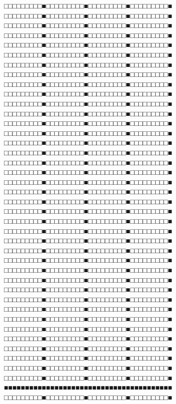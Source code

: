 \noindent
□□□□□□□□□■□□□□□□□□□■□□□□□□□□□■□□□□□□□□□■
□□□□□□□□□■□□□□□□□□□■□□□□□□□□□■□□□□□□□□□■
□□□□□□□□□■□□□□□□□□□■□□□□□□□□□■□□□□□□□□□■
□□□□□□□□□■□□□□□□□□□■□□□□□□□□□■□□□□□□□□□■
□□□□□□□□□■□□□□□□□□□■□□□□□□□□□■□□□□□□□□□■
□□□□□□□□□■□□□□□□□□□■□□□□□□□□□■□□□□□□□□□■
□□□□□□□□□■□□□□□□□□□■□□□□□□□□□■□□□□□□□□□■
□□□□□□□□□■□□□□□□□□□■□□□□□□□□□■□□□□□□□□□■
□□□□□□□□□■□□□□□□□□□■□□□□□□□□□■□□□□□□□□□■
□□□□□□□□□■□□□□□□□□□■□□□□□□□□□■□□□□□□□□□■
□□□□□□□□□■□□□□□□□□□■□□□□□□□□□■□□□□□□□□□■
□□□□□□□□□■□□□□□□□□□■□□□□□□□□□■□□□□□□□□□■
□□□□□□□□□■□□□□□□□□□■□□□□□□□□□■□□□□□□□□□■
□□□□□□□□□■□□□□□□□□□■□□□□□□□□□■□□□□□□□□□■
□□□□□□□□□■□□□□□□□□□■□□□□□□□□□■□□□□□□□□□■
□□□□□□□□□■□□□□□□□□□■□□□□□□□□□■□□□□□□□□□■
□□□□□□□□□■□□□□□□□□□■□□□□□□□□□■□□□□□□□□□■
□□□□□□□□□■□□□□□□□□□■□□□□□□□□□■□□□□□□□□□■
□□□□□□□□□■□□□□□□□□□■□□□□□□□□□■□□□□□□□□□■
□□□□□□□□□■□□□□□□□□□■□□□□□□□□□■□□□□□□□□□■
□□□□□□□□□■□□□□□□□□□■□□□□□□□□□■□□□□□□□□□■
□□□□□□□□□■□□□□□□□□□■□□□□□□□□□■□□□□□□□□□■
□□□□□□□□□■□□□□□□□□□■□□□□□□□□□■□□□□□□□□□■
□□□□□□□□□■□□□□□□□□□■□□□□□□□□□■□□□□□□□□□■
□□□□□□□□□■□□□□□□□□□■□□□□□□□□□■□□□□□□□□□■
□□□□□□□□□■□□□□□□□□□■□□□□□□□□□■□□□□□□□□□■
□□□□□□□□□■□□□□□□□□□■□□□□□□□□□■□□□□□□□□□■
□□□□□□□□□■□□□□□□□□□■□□□□□□□□□■□□□□□□□□□■
□□□□□□□□□■□□□□□□□□□■□□□□□□□□□■□□□□□□□□□■
□□□□□□□□□■□□□□□□□□□■□□□□□□□□□■□□□□□□□□□■
□□□□□□□□□■□□□□□□□□□■□□□□□□□□□■□□□□□□□□□■
□□□□□□□□□■□□□□□□□□□■□□□□□□□□□■□□□□□□□□□■
□□□□□□□□□■□□□□□□□□□■□□□□□□□□□■□□□□□□□□□■
□□□□□□□□□■□□□□□□□□□■□□□□□□□□□■□□□□□□□□□■
□□□□□□□□□■□□□□□□□□□■□□□□□□□□□■□□□□□□□□□■
□□□□□□□□□■□□□□□□□□□■□□□□□□□□□■□□□□□□□□□■
□□□□□□□□□■□□□□□□□□□■□□□□□□□□□■□□□□□□□□□■
□□□□□□□□□■□□□□□□□□□■□□□□□□□□□■□□□□□□□□□■
□□□□□□□□□■□□□□□□□□□■□□□□□□□□□■□□□□□□□□□■
■■■■■■■■■■■■■■■■■■■■■■■■■■■■■■■■■■■■■■■■
□□□□□□□□□■□□□□□□□□□■□□□□□□□□□■□□□□□□□□□■
